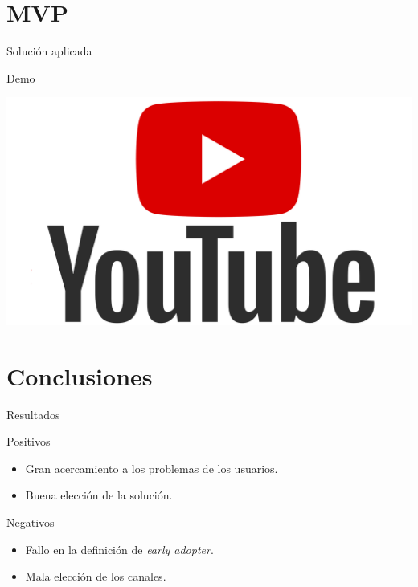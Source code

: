 \documentclass[12pt]{beamer}
\begin{document}
	\section{MVP}
		\begin{frame}{Solución aplicada}
			\begin{center}
			\end{center}
		\end{frame}

		\begin{frame}{Demo}
			\begin{center}
				\includegraphics[width=\textwidth,height=0.5\textheight,keepaspectratio]{img/architecture/youtube}
			\end{center}
			\begin{center}
				\href{https://bit.ly/2ZqCkrJ}{}
			\end{center}
		\end{frame}
	

	\section{Conclusiones}
		\begin{frame}{Resultados}
			\begin{block}{Positivos}
				\begin{itemize}
					\item Gran acercamiento a los problemas de los usuarios.
					\item Buena elección de la solución.
				\end{itemize}
			\end{block}
			\begin{block}{Negativos}
				\begin{itemize}
					\item Fallo en la definición de \textit{early adopter}.
					\item Mala elección de los canales.
				\end{itemize}
			\end{block}
		\end{frame}
		
\end{document}
